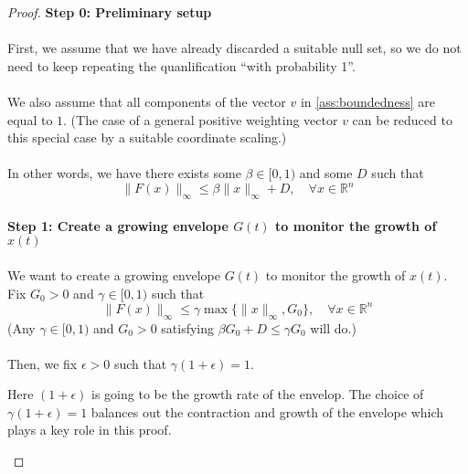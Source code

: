 \begin{proof}
\textbf{Step 0: Preliminary setup}\\
\\
First, we assume that we have already discarded a suitable null set, so we do not need to keep repeating the quanlification ``with probability 1''.\\
\\
We also assume that all components of the vector $v$ in \autoref{ass:boundedness}  are equal to $1$. (The case of a general positive weighting vector $v$ can be reduced to this special case by a suitable coordinate scaling.)\\
\\
In other words, we have there exists some $\beta\in [0,1)$ and some $D$ such that 
$$
\|F(x)\|_\infty \le \beta\|x\|_\infty  + D,\quad \forall x\in\mathbb{R}^n
$$
\\
\textbf{Step 1: Create a growing envelope $G(t)$ to monitor the growth of $x(t)$}\\
\\
We want to create a growing envelope $G(t)$ to monitor the growth of $x(t)$. Fix $G_0>0$ and $\gamma\in[0,1)$ such that
\begin{equation}\label{eq:Fandgamma}
    \|F(x)\|_\infty  \le \gamma \max\{\|x\|_\infty, G_0\},\quad\forall x\in\mathbb{R}^n
\end{equation}
(Any $\gamma\in[0,1)$ and $G_0>0$ satisfying $\beta G_0+D\le \gamma G_0$ will do.)\\
\\
Then, we fix $\epsilon>0$ such that $\gamma(1+\epsilon)=1$.
\begin{remark}
    Here $(1+\epsilon)$ is going to be the growth rate of the envelop. The choice of $\gamma(1+\epsilon)=1$ balances out the contraction and growth of the envelope which plays a key role in this proof.
\end{remark}


\end{proof}
